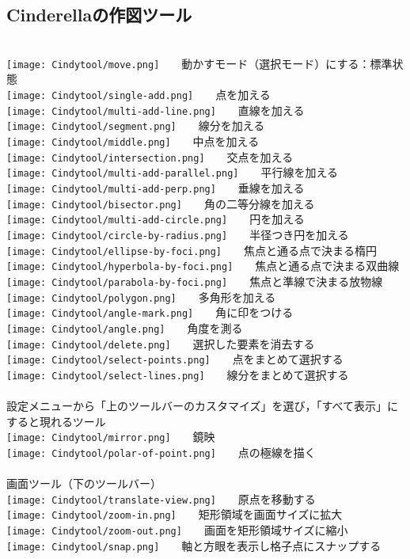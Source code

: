 \documentclass[papersize,a4paper,12pt,uplatex]{jsarticle}
\begin{document}
\subsection{Cinderellaの作図ツール}
 　\\
\texttt{[image: Cindytool/move.png]}　　動かすモード（選択モード）にする：標準状態\\
\texttt{[image: Cindytool/single-add.png]}　　点を加える\\
\texttt{[image: Cindytool/multi-add-line.png]}　　直線を加える\\
\texttt{[image: Cindytool/segment.png]}　　線分を加える\\
\texttt{[image: Cindytool/middle.png]}　　中点を加える\\
\texttt{[image: Cindytool/intersection.png]}　　交点を加える\\
\texttt{[image: Cindytool/multi-add-parallel.png]}　　平行線を加える\\
\texttt{[image: Cindytool/multi-add-perp.png]}　　垂線を加える\\
\texttt{[image: Cindytool/bisector.png]}　　角の二等分線を加える\\
\texttt{[image: Cindytool/multi-add-circle.png]}　　円を加える\\
\texttt{[image: Cindytool/circle-by-radius.png]}　　半径つき円を加える\\
\texttt{[image: Cindytool/ellipse-by-foci.png]}　　焦点と通る点で決まる楕円\\
\texttt{[image: Cindytool/hyperbola-by-foci.png]}　　焦点と通る点で決まる双曲線\\
\texttt{[image: Cindytool/parabola-by-foci.png]}　　焦点と準線で決まる放物線\\
\texttt{[image: Cindytool/polygon.png]}　　多角形を加える\\
\texttt{[image: Cindytool/angle-mark.png]}　　角に印をつける\\
\texttt{[image: Cindytool/angle.png]}　　角度を測る\\
\texttt{[image: Cindytool/delete.png]}　　選択した要素を消去する\\
\texttt{[image: Cindytool/select-points.png]}　　点をまとめて選択する\\
\texttt{[image: Cindytool/select-lines.png]}　　線分をまとめて選択する\\
　\\
設定メニューから「上のツールバーのカスタマイズ」を選び，「すべて表示」にすると現れるツール\\
\texttt{[image: Cindytool/mirror.png]}　　鏡映\\
\texttt{[image: Cindytool/polar-of-point.png]}　　点の極線を描く\\
　\\
画面ツール（下のツールバー）\\
\texttt{[image: Cindytool/translate-view.png]}　　原点を移動する\\
\texttt{[image: Cindytool/zoom-in.png]}　　矩形領域を画面サイズに拡大\\
\texttt{[image: Cindytool/zoom-out.png]}　　画面を矩形領域サイズに縮小\\
\texttt{[image: Cindytool/snap.png]}　　軸と方眼を表示し格子点にスナップする\\
\end{document}
